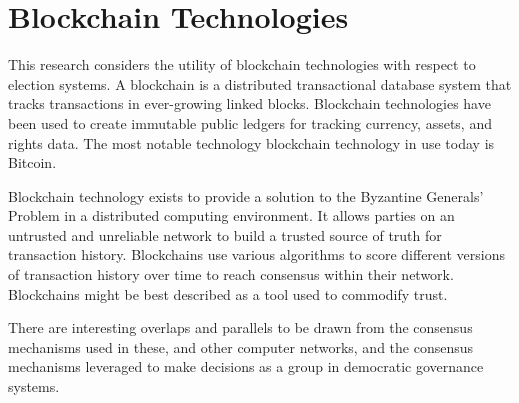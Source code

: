 \section{Blockchain Technologies}\label{sec:blockchain-technologies}
This research considers the utility of blockchain technologies with respect to
election systems. A blockchain is a distributed transactional database system
that tracks transactions in ever-growing linked blocks. Blockchain technologies
have been used to create immutable public ledgers for tracking currency, assets,
and rights data. The most notable technology blockchain technology in use today
is Bitcoin.

Blockchain technology exists to provide a solution to the Byzantine Generals'
Problem in a distributed computing environment.\footnotemark{} It allows parties
on an untrusted and unreliable network to build a trusted source of truth for
transaction history. Blockchains use various algorithms to score different
versions of transaction history over time to reach consensus within their
network. Blockchains might be best described as a tool used to commodify trust.


There are interesting overlaps and parallels to be drawn from the consensus
mechanisms used in these, and other computer networks, and the consensus
mechanisms leveraged to make decisions as a group in democratic governance
systems.




